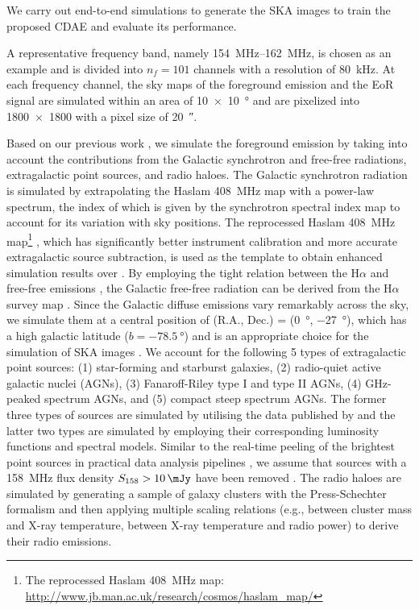 \documentclass[fleqn,usenatbib]{mnras}
\newcommand{\editone}[1]{{\leavevmode\color{cyan}#1}}
\begin{document}
We carry out end-to-end simulations to generate the SKA images to
train the proposed CDAE and evaluate its performance.
\editone{%
A representative frequency band, namely \SIrange{154}{162}{\MHz}, is chosen
as an example \citep[e.g.,][]{datta2010} and is divided into $n_f = 101$
channels with a resolution of \SI{80}{\kHz}.
At each frequency channel, the sky maps of the foreground emission and the
EoR signal are simulated within an area of \SI{10 x 10}{\degree} and are
pixelized into \num{1800 x 1800} with a pixel size of \SI{20}{\arcsecond}.

Based on our previous work \citep{wang2010}, we simulate the foreground
emission by taking into account the contributions from the Galactic
synchrotron and free-free radiations, extragalactic point sources, and
radio haloes.
The Galactic synchrotron radiation is simulated by extrapolating the Haslam
\SI{408}{\MHz} map with a power-law spectrum, the index of which is given
by the synchrotron spectral index map \citep{giardino2002} to account for
its variation with sky positions.
The reprocessed Haslam \SI{408}{\MHz} map\footnote{%
  The reprocessed Haslam \SI{408}{\MHz} map:
  \url{http://www.jb.man.ac.uk/research/cosmos/haslam_map/}}
\citep{remazeilles2015}, which has significantly better instrument
calibration and more accurate extragalactic source subtraction,
is used as the template to obtain enhanced simulation results over
\citet{wang2010}.
By employing the tight relation between the H$\alpha$ and free-free
emissions \citep[see][and references therein]{dickinson2003}, the Galactic
free-free radiation can be derived from the H$\alpha$ survey map
\citep{finkbeiner2003}.
Since the Galactic diffuse emissions vary remarkably across the sky, we
simulate them at a central position of (R.A., Dec\@.) = (\SI{0}{\degree},
\SI{-27}{\degree}), which has a high galactic latitude
($b = \SI{-78.5}{\degree}$) and is an appropriate choice for the simulation
of SKA images \citep[e.g.,][]{beardsley2016}.
We account for the following 5 types of extragalactic point sources:
(1) star-forming and starburst galaxies, (2) radio-quiet active galactic
nuclei (AGNs), (3) Fanaroff-Riley type I and type II AGNs, (4) GHz-peaked
spectrum AGNs, and (5) compact steep spectrum AGNs.
The former three types of sources are simulated by utilising the data
published by \citet{wilman2008} and the latter two types are simulated by
employing their corresponding luminosity functions and spectral models.
Similar to the real-time peeling of the brightest point sources in
practical data analysis pipelines \citep[e.g.,][]{mitchell2008,intema2009},
we assume that sources with a \SI{158}{\MHz} flux density
$S_{158} > \SI{10}{\mJy}$ have been removed \citep[e.g.,][]{liu2009ps}.
The radio haloes are simulated by generating a sample of galaxy clusters
with the Press-Schechter formalism \citep{press1974} and then applying
multiple scaling relations (e.g., between cluster mass and X-ray
temperature, between X-ray temperature and radio power) to derive their
radio emissions.

}
\end{document}
